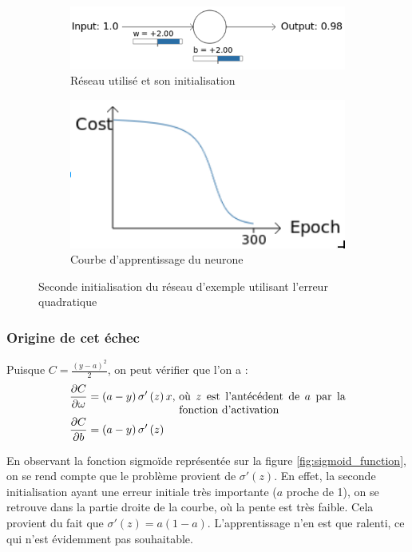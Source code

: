 \begin{figure}[h]
\centering
\begin{subfigure}{.5\textwidth}
  \centering
  \includegraphics[width=.6\linewidth]{img/entropiecroisee_reseau_utilise_init2.png}
  \caption{Réseau utilisé et son initialisation}
  \label{fig:initialisation2-entropiecroisee-schema}
\end{subfigure}%
\begin{subfigure}{.4\textwidth}
  \centering
  \includegraphics[width=.4\linewidth]{img/entropiecroisee_apprentissage2.png}
  \caption{Courbe d'apprentissage du neurone}
  \label{fig:initialisation2-entropiecroisee-courbe}
\end{subfigure}
\caption{Seconde initialisation du réseau d'exemple utilisant l'erreur quadratique}
\label{fig:initialisation2-entropiecroisee}
\end{figure}

\subsubsection{Origine de cet échec}

Puisque $C = \frac{(y-a)^2}{2}$, on peut vérifier que l'on a :
\begin{align}
 \frac{\partial C}{\partial \omega} &= \left(a-y\right)\sigma'\left(z\right)x \text{, \parbox[t]{15em}{où $z$ est l'antécédent de $a$ par la fonction d'activation}}\\
 \frac{\partial C}{\partial b} &= \left(a-y\right)\sigma'\left(z\right) 
\end{align}

En observant la fonction sigmoïde représentée sur la figure \ref{fig:sigmoid_function}, on se rend compte que le problème provient de $\sigma'\left(z\right)$.
En effet, la seconde initialisation ayant une erreur initiale très importante ($a$ proche de 1), on se retrouve dans la 
partie droite de la courbe, où la pente est très faible. Cela provient du fait que $\sigma'\left(z\right) = a\left(1-a\right)$.
L'apprentissage n'en est que ralenti, ce qui n'est évidemment pas souhaitable. 

